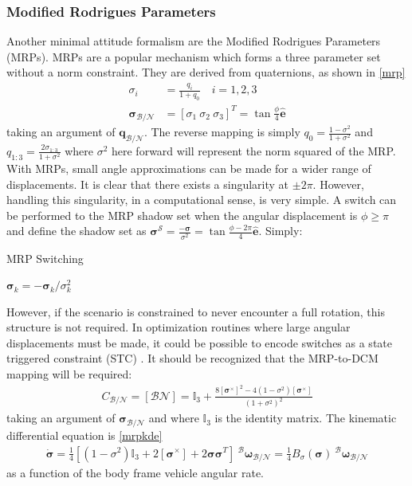 \documentclass[conf]{new-aiaa}
\begin{document}
\subsubsection{Modified Rodrigues Parameters}
Another minimal attitude formalism are the Modified Rodrigues Parameters (MRPs). 
MRPs are a popular mechanism which forms a three parameter set without a norm constraint. They are derived from quaternions, as shown in \ref{mrp}
%
\begin{align}
\label{mrp}
	\sigma_i &= \frac{q_i}{1+q_0} \quad i = 1,2,3 \\
	\boldsymbol{\sigma}_\mathcal{B/N} &= [\sigma_1 \ \sigma_2 \ \sigma_3]^T = \tan\frac{\phi}{4}\hat{\bm{e}}
\end{align}
taking an argument of $\bm{q}_\mathcal{B/N}$. The reverse mapping is simply $q_0 = \frac{1-\sigma^2}{1+\sigma^2}$ and $q_{1:3} = \frac{2\sigma_{1:3}}{1+\sigma^2}$ where $\sigma^2$ here forward will represent the norm squared of the MRP. With MRPs, small angle approximations can be made for a wider range of displacements. It is clear that there exists a singularity at $\pm 2\pi$. However, handling this singularity, in a computational sense, is very simple. A switch can be performed to the MRP shadow set when the angular displacement is $\phi \geq \pi$ and define the shadow set as $\boldsymbol{\sigma}^\mathcal{S} = \frac{-\boldsymbol{\sigma}}{\sigma^2} = \tan{\frac{\phi-2\pi}{4}}\hat{\bm{e}}$. Simply: 

\begin{algorithm}
\caption{MRP Switching}\label{mrpswitch}
\begin{algorithmic}[1]
\State $\boldsymbol{\sigma}_{k} = -{\boldsymbol{\sigma}_{k}}/{\sigma_k^2}$
\EndIf 
\EndProcedure
\end{algorithmic}
\end{algorithm}
However, if the scenario is constrained to never encounter a full rotation, this structure is not required. In optimization routines where large angular displacements must be made, it could be possible to encode switches as a state triggered constraint (STC) \cite{szmuk2019successive}. It should be recognized that the MRP-to-DCM mapping will be required:
\begin{align}
\label{mrp2c}
	C_{\mathcal{B/N}} = [\mathcal{BN}]= \mathbb{I}_3 +  \frac{8[\boldsymbol{\sigma}^\times]^2 - 4(1-\sigma^2)[\boldsymbol{\sigma}^\times]}{(1+\sigma^2)^2}
\end{align}
taking an argument of $\boldsymbol{\sigma}_\mathcal{B/N}$ and where $\mathbb{I}_3$ is the identity matrix. The kinematic differential equation is \ref{mrpkde}
%
\begin{align}
\label{mrpkde}
	\dot{\boldsymbol{\sigma}} = \frac{1}{4}[(1-\sigma^2)\mathbb{I}_3 +  2[\boldsymbol{\sigma}^\times] + 2\boldsymbol{\sigma}\boldsymbol{\sigma}^T] \ ^\mathcal{B}\boldsymbol{\omega}_\mathcal{B/N} = \frac{1}{4}B_\sigma(\boldsymbol{\sigma}) \ ^\mathcal{B}\boldsymbol{\omega}_\mathcal{B/N}
\end{align}
as a function of the body frame vehicle angular rate.
\end{document}
